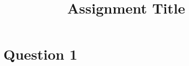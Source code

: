 \documentclass[a4paper, 11pt]{article}
\title{Assignment Title}
\author{}
\theoremstyle{plain}
\theoremstyle{definition}
\begin{document}
\maketitle

\section*{Question 1}




\appendix


\end{document}
